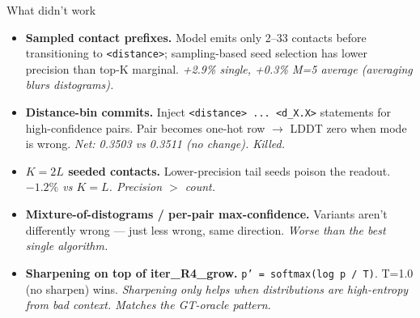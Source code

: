 \documentclass[aspectratio=169,11pt]{beamer}
\newcommand{\code}[1]{\texttt{\small\color{navy}#1}}
\begin{document}
\begin{frame}{What didn't work}
  \begin{itemize}
    \setlength\itemsep{0.4em}
    \item[\color{red}$\times$] \textbf{Sampled contact prefixes.}
      Model emits only 2--33 contacts before transitioning to
      \code{<distance>}; sampling-based seed selection has lower precision
      than top-K marginal. {\small\color{grey}\itshape
      +2.9\% single, +0.3\% M=5 average (averaging blurs distograms).}
    \item[\color{red}$\times$] \textbf{Distance-bin commits.}
      Inject \code{<distance> ... <d\_X.X>} statements for high-confidence pairs.
      Pair becomes one-hot row $\rightarrow$ LDDT zero when mode is wrong.
      {\small\color{grey}\itshape
      Net: 0.3503 vs 0.3511 (no change). Killed.}
    \item[\color{red}$\times$] \textbf{$K = 2L$ seeded contacts.}
      Lower-precision tail seeds poison the readout.
      {\small\color{grey}\itshape $-1.2\%$ vs $K = L$.
        Precision $>$ count.}
    \item[\color{red}$\times$] \textbf{Mixture-of-distograms / per-pair max-confidence.}
      Variants aren't differently wrong --- just less wrong, same direction.
      {\small\color{grey}\itshape Worse than the best single algorithm.}
    \item[\color{red}$\times$] \textbf{Sharpening on top of iter\_R4\_grow.}
      \code{p' = softmax(log p / T)}. T=1.0 (no sharpen) wins.
      {\small\color{grey}\itshape Sharpening only helps when distributions are
      high-entropy from bad context. Matches the GT-oracle pattern.}
  \end{itemize}
\end{frame}
\end{document}

